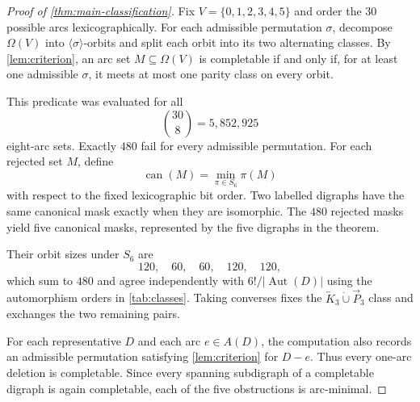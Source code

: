 \documentclass[10pt,a4paper]{amsart}
\newcommand{\Aut}{\operatorname{Aut}}
\newcommand{\bK}[1]{\overleftrightarrow{K}_{#1}}
\newcommand{\can}{\operatorname{can}}
\newcommand{\dP}{\overrightarrow{P}_{3}}
\newcommand{\dunion}{\mathbin{\dot\cup}}
\begin{document}
\begin{proof}[Proof of \cref{thm:main-classification}]
Fix \(V=\{0,1,2,3,4,5\}\) and order the \(30\) possible arcs lexicographically. For each admissible permutation \(\sigma\), decompose \(\Omega(V)\) into \(\langle\sigma\rangle\)-orbits and split each orbit into its two alternating classes. By \cref{lem:criterion}, an arc set \(M\subseteq\Omega(V)\) is completable if and only if, for at least one admissible \(\sigma\), it meets at most one parity class on every orbit.

This predicate was evaluated for all
\[
\binom{30}{8}=5{,}852{,}925
\]
eight-arc sets. Exactly \(480\) fail for every admissible permutation. For each rejected set \(M\), define
\[
\can(M)=\min_{\pi\in S_6}\pi(M)
\]
with respect to the fixed lexicographic bit order. Two labelled digraphs have the same canonical mask exactly when they are isomorphic. The \(480\) rejected masks yield five canonical masks, represented by the five digraphs in the theorem.

Their orbit sizes under \(S_6\) are
\[
120,\quad 60,\quad 60,\quad 120,\quad 120,
\]
which sum to \(480\) and agree independently with \(6!/|\Aut(D)|\) using the automorphism orders in \cref{tab:classes}. Taking converses fixes the \(\bK{3}\dunion\dP\) class and exchanges the two remaining pairs.

For each representative \(D\) and each arc \(e\in A(D)\), the computation also records an admissible permutation satisfying \cref{lem:criterion} for \(D-e\). Thus every one-arc deletion is completable. Since every spanning subdigraph of a completable digraph is again completable, each of the five obstructions is arc-minimal.
\end{proof}
\end{document}
